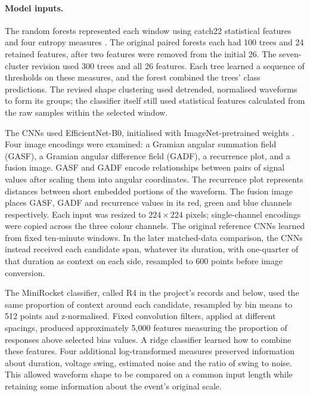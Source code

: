 \paragraph{Model inputs.}
The random forests represented each window using catch22 statistical features and four entropy measures \cite{lubba2019catch22}. The original paired forests each had 100 trees and 24 retained features, after two features were removed from the initial 26. The seven-cluster revision used 300 trees and all 26 features. Each tree learned a sequence of thresholds on these measures, and the forest combined the trees' class predictions. The revised shape clustering used detrended, normalised waveforms to form its groups; the classifier itself still used statistical features calculated from the raw samples within the selected window.

The CNNs used EfficientNet-B0, initialised with ImageNet-pretrained weights \cite{tan2019efficientnet}. Four image encodings were examined: a Gramian angular summation field (GASF), a Gramian angular difference field (GADF), a recurrence plot, and a fusion image. GASF and GADF encode relationships between pairs of signal values after scaling them into angular coordinates. The recurrence plot represents distances between short embedded portions of the waveform. The fusion image places GASF, GADF and recurrence values in its red, green and blue channels respectively. Each input was resized to $224\times224$ pixels; single-channel encodings were copied across the three colour channels. The original reference CNNs learned from fixed ten-minute windows. In the later matched-data comparison, the CNNs instead received each candidate span, whatever its duration, with one-quarter of that duration as context on each side, resampled to 600 points before image conversion.

The MiniRocket classifier, called R4 in the project's records and below, used the same proportion of context around each candidate, resampled by bin means to 512 points and z-normalised. Fixed convolution filters, applied at different spacings, produced approximately 5,000 features measuring the proportion of responses above selected bias values. A ridge classifier learned how to combine these features. Four additional log-transformed measures preserved information about duration, voltage swing, estimated noise and the ratio of swing to noise. This allowed waveform shape to be compared on a common input length while retaining some information about the event's original scale.

